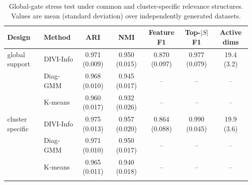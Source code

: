 \begin{table}[t]
\centering
\caption{Global-gate stress test under common and cluster-specific relevance structures. Values are mean (standard deviation) over independently generated datasets.}
\label{tab:cluster_specific_relevance}
\begin{tabular}{llccccc}
\toprule
Design & Method & ARI & NMI & Feature F1 & Top-$|S|$ F1 & Active dims \\
\midrule
global support & DIVI-Info & 0.971 (0.009) & 0.950 (0.015) & 0.870 (0.097) & 0.977 (0.079) & 19.4 (3.2) \\
 & Diag-GMM & 0.968 (0.010) & 0.945 (0.017) & -- & -- & -- \\
 & K-means & 0.960 (0.017) & 0.932 (0.026) & -- & -- & -- \\
\addlinespace
cluster specific & DIVI-Info & 0.975 (0.013) & 0.957 (0.020) & 0.864 (0.088) & 0.990 (0.045) & 19.9 (3.6) \\
 & Diag-GMM & 0.971 (0.010) & 0.950 (0.017) & -- & -- & -- \\
 & K-means & 0.965 (0.011) & 0.940 (0.018) & -- & -- & -- \\
\addlinespace
\bottomrule
\end{tabular}
\end{table}